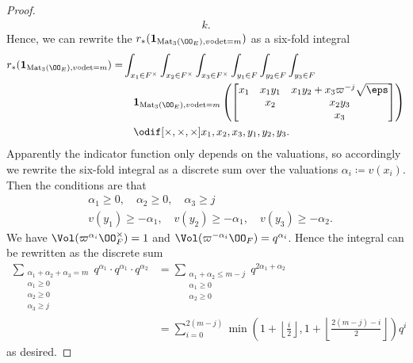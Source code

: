 \begin{proof}
\begin{align*}
    k.
  \end{align*}
  Hence, we can rewrite the $r_\ast(\mathbf{1}_{\Mat_3(\OO_E), v\circ\det=m})$
  as a six-fold integral
  \begin{align*}
    r_\ast(\mathbf{1}_{\Mat_3(\OO_E), v\circ\det=m}) =
    & \int_{x_1 \in F^\times} \int_{x_2 \in F^\times} \int_{x_3 \in F^\times}
    \int_{y_1 \in F} \int_{y_2 \in F} \int_{y_3 \in F} \\
    &\quad \mathbf{1}_{\Mat_3(\OO_E), v\circ\det=m} \left(
    \begin{bmatrix}
      x_1 & x_1 y_1 & x_1 y_2 + x_3 \varpi^{-j} \sqrt\eps \\
      & x_2 & x_2 y_3 \\
      & & x_3
    \end{bmatrix}
    \right) \\
    &\quad \odif[{\times,\times,\times}]{x_1,x_2,x_3,y_1,y_2,y_3}.
  \end{align*}
  Apparently the indicator function only depends on the valuations,
  so accordingly we rewrite the six-fold integral as a discrete sum over the valuations
  $\alpha_i \coloneqq v(x_i)$.
  Then the conditions are that
  \begin{align*}
    &\alpha_1 \ge 0, \quad \alpha_2 \ge 0, \quad \alpha_3 \ge j \\
    &v(y_1) \ge - \alpha_1, \quad v(y_2) \ge - \alpha_1, \quad v(y_3) \ge -\alpha_2.
  \end{align*}
  We have $\Vol(\varpi^{\alpha_i} \OO_F^\times) = 1$
  and $\Vol(\varpi^{-\alpha_i} \OO_F) = q^{\alpha_i}$.
  Hence the integral can be rewritten as the discrete sum
  \begin{align*}
    \sum_{\substack{\alpha_1 + \alpha_2 + \alpha_3 = m \\ \alpha_1 \ge 0 \\ \alpha_2 \ge 0 \\ \alpha_3 \ge j}}
    q^{\alpha_1} \cdot q^{\alpha_1} \cdot q^{\alpha_2}
    &= \sum_{\substack{\alpha_1 + \alpha_2 \le m-j \\ \alpha_1 \ge 0 \\ \alpha_2 \ge 0}}
    q^{2\alpha_1+\alpha_2} \\
    &= \sum_{i=0}^{2(m-j)}
    \min \left( 1 + \left\lfloor \frac i2 \right\rfloor,
      1 + \left\lfloor \frac{2(m-j)-i}{2} \right\rfloor
    \right) q^i
  \end{align*}
  as desired.
\end{proof}

